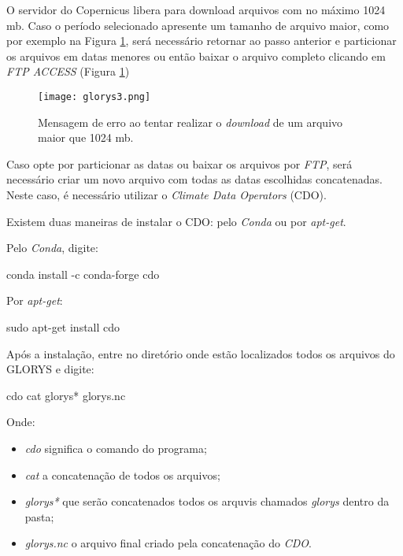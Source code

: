 \noindent O servidor do Copernicus libera para download arquivos com no máximo 1024 mb. Caso o período selecionado apresente um tamanho de arquivo maior, como por exemplo na Figura \textcolor{bleu_cite}{\ref{glorys3}}, será necessário retornar ao passo anterior e particionar os arquivos em datas menores ou então baixar o arquivo completo clicando em \textit{FTP ACCESS} (Figura \textcolor{bleu_cite}{\ref{glorys3}})
\bigskip

\begin{figure}[H]
    \centering
    \texttt{[image: glorys3.png]}
    \caption{Mensagem de erro ao tentar realizar o \textit{download} de um arquivo maior que 1024 mb.}
    \label{glorys3}
\end{figure}
\bigskip


\noindent Caso opte por particionar as datas ou baixar os arquivos por \textit{FTP}, será necessário criar um novo arquivo com todas as datas escolhidas concatenadas. Neste caso, é necessário utilizar o \textit{Climate Data Operators} (CDO). 
\bigskip

\noindent Existem duas maneiras de  instalar o CDO: pelo \textit{Conda} ou por \textit{apt-get}.
\bigskip

\noindent Pelo \textit{Conda}, digite:
\bigskip

\begin{bashcode}
conda install -c conda-forge cdo
\end{bashcode}
\bigskip

\noindent Por \textit{apt-get}:
\bigskip

\begin{bashcode}
sudo apt-get install cdo
\end{bashcode}
\bigskip

\noindent Após a instalação, entre no diretório onde estão localizados todos os arquivos do GLORYS e digite:
\bigskip

\begin{bashcode}
cdo cat glorys* glorys.nc
\end{bashcode}
\bigskip

\noindent Onde: 
\bigskip

\begin{itemize}
    \item  \textit{cdo} significa o comando do programa;
    \item \textit{cat} a concatenação de todos os arquivos;
    \item \textit{glorys*} que serão concatenados todos os arquvis chamados \textit{glorys} dentro da pasta; 
    \item \textit{glorys.nc} o arquivo final criado pela concatenação do \textit{CDO}.
\end{itemize}

